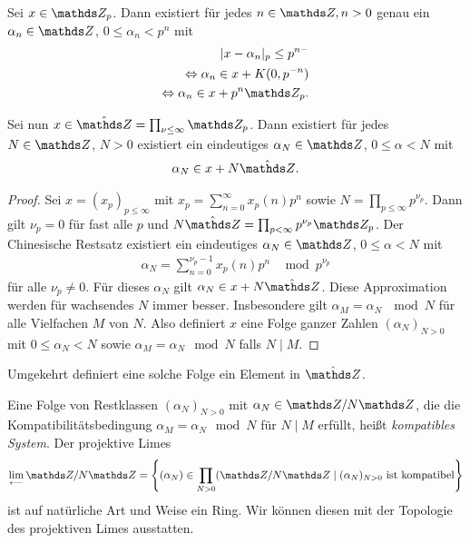 Sei $x\in \Z_p$. Dann existiert für jedes $n \in \Z, n>0$ genau ein $\alpha_n \in \Z$, $0 \leq \alpha_n<p^n$ mit
\begin{align*}
\abs{x-\alpha_n}_p \leq p^{n-}\\
\Leftrightarrow \alpha_n \in x+K(0,p^{-n})\\
\Leftrightarrow \alpha_n \in x+p^n \Z_p.
\end{align*}

\begin{thm}
Sei nun $x\in \hat{\Z}=\prod_{\nu \leq \infty} \Z_p$. Dann existiert für jedes $N \in \Z$, $N>0$ existiert ein eindeutiges $\alpha_N\in \Z$, $0 \leq \alpha<N$ mit
\begin{align*}
\alpha_N \in x + N\hat{\Z}.
\end{align*}
\end{thm}
\begin{proof}
Sei $x=(x_p)_{p\leq \infty}$ mit $x_p=\sum_{n=0}^\infty x_p(n)p^n$ sowie $N=\prod_{p\leq \infty} p^{\nu_p}$.
Dann gilt $\nu_p=0$ für fast alle $p$ und $N\hat{\Z}=\prod_{p<\infty}p^{\nu_p} \Z_p$.
Der Chinesische Restsatz existiert ein eindeutiges $\alpha_N \in \Z$, $0\leq \alpha <N$ mit 
\begin{align*}
\alpha_N=\sum_{n=0}^{\nu_p-1} x_p(n)p^n~~\mod p^{\nu_p}
\end{align*}
für alle $\nu_p\not =0$. Für dieses $\alpha_N$ gilt $\alpha_N \in x+N \hat{\Z}$.
Diese Approximation werden für wachsendes $N$ immer besser.
Insbesondere gilt $\alpha_M=\alpha_N ~\mod N$ für alle Vielfachen $M$ von $N$. Also definiert $x$ eine Folge ganzer Zahlen $(\alpha_N)_{N>0}$ mit $0\leq \alpha_N <N$ sowie $\alpha_M=\alpha_N \mod N$ falls $N\mid M$.
\end{proof}

Umgekehrt definiert eine solche Folge ein Element in $\hat{\Z}$.

\begin{defi}
Eine Folge von Restklassen $(\alpha_N)_{N>0}$ mit $\alpha_N\in\Z /N\Z$, die die Kompatibilitätsbedingung $\alpha_M=\alpha_N \mod N$ für $N \mid M$ erfüllt, heißt \emph{kompatibles System}.
Der projektive Limes
\begin{align*}
\lim_{\longleftarrow} \Z /N \Z=\left\lbrace(\alpha_N) \in \prod_{N>0} (\Z /N \Z \mid (\alpha_N)_{N>0} \text{ ist kompatibel}\right\rbrace
\end{align*}
ist auf natürliche Art und Weise ein Ring.
Wir können diesen mit der Topologie des projektiven Limes ausstatten.
\end{defi}

